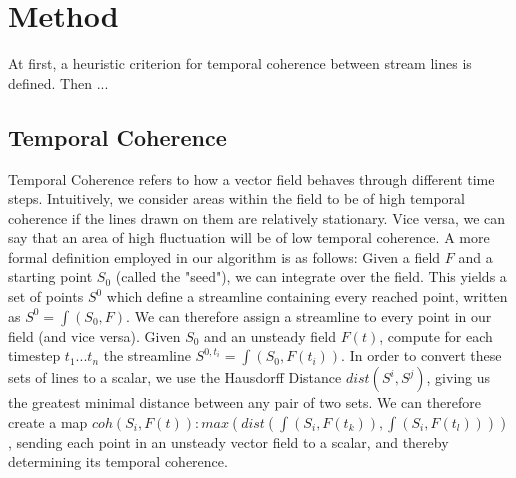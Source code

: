 \chapter{Method}
At first, a heuristic criterion for temporal coherence between stream lines is defined.
Then ...

\section{Temporal Coherence}
Temporal Coherence refers to how a vector field behaves through different time steps.
Intuitively, we consider areas within the field to be of high temporal coherence if the lines drawn on them are relatively stationary.
Vice versa, we can say that an area of high fluctuation will be of low temporal coherence.
A more formal definition employed in our algorithm is as follows:
Given a field $F$ and a starting point $S_0$ (called the "seed"), we can integrate over the field.
This yields a set of points $S^0$ which define a streamline containing every reached point, written as $S^0 = \int(S_0, F)$.
We can therefore assign a streamline to every point in our field (and vice versa).
Given $S_0$ and an unsteady field $F(t)$, compute for each timestep $t_1...t_n$ the streamline $S^{0,t_i} = \int(S_0, F(t_i))$.
In order to convert these sets of lines to a scalar, we use the Hausdorff Distance $dist(S^i,S^j)$,
giving us the greatest minimal distance between any pair of two sets.
We can therefore create a map $coh(S_i, F(t)): max(dist(\int(S_i, F(t_k)), \int(S_i, F(t_l))))$,
sending each point in an unsteady vector field to a scalar, and thereby determining its temporal coherence.
